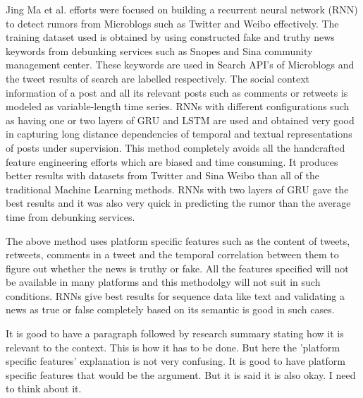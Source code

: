 \documentclass[a4paper, 11pt]{article}
\begin{document}
Jing Ma et al.\cite{Ma} efforts were focused on building a recurrent neural network (RNN) to detect rumors from Microblogs such as Twitter and Weibo effectively. The training dataset used is obtained by using constructed fake and truthy news keywords from debunking services such as Snopes and Sina community management center. These keywords are used in Search API's of Microblogs and the tweet results of search are labelled respectively. The social context information of a post and all its relevant posts such as comments or retweets is modeled as variable-length time series. RNNs with different configurations such as having one or two layers of GRU and LSTM are used and obtained very good in capturing long distance dependencies of temporal and textual representations of posts under supervision. This method completely avoids all the handcrafted feature engineering efforts which are biased and time consuming. It produces better results with datasets from Twitter and Sina Weibo than all of the traditional Machine Learning methods. RNNs with two layers of GRU gave the best results and it was also very quick in predicting the rumor than the average time from debunking services.

The above method uses platform specific features such as the content of tweets, retweets, comments in a tweet and the temporal correlation between them to figure out whether the news is truthy or fake. All the features specified will not be available in many platforms and this methodolgy will not suit in such conditions. RNNs give best results for sequence data like text and validating a news as true or false completely based on its semantic is good in such cases.

\color{red}
It is good to have a paragraph followed by research summary stating how it is relevant to the context. This is how it has to be done. But here the 'platform specific features' explanation is not very confusing. It is good to have platform specific features that would be the argument. But it is said it is also okay. I need to think about it. 
\color{black}
\end{document}
